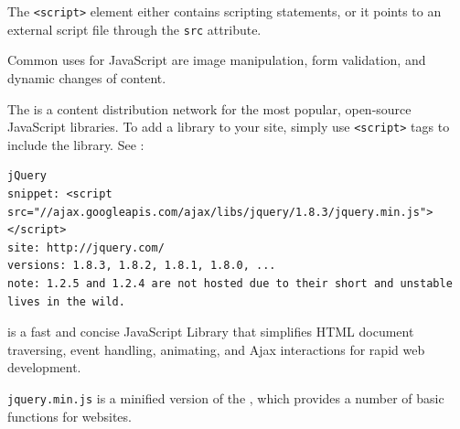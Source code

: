 The \verb|<script>| element either contains scripting statements, or it points to an external script file through the \verb|src| attribute.

Common uses for JavaScript are image manipulation, form validation, and dynamic changes of content.

The  is a content distribution network for
the most popular, open-source JavaScript libraries. To add a library
to your site, simply use \verb|<script>| tags to include the library.
See :
\begin{verbatim}
jQuery
snippet: <script src="//ajax.googleapis.com/ajax/libs/jquery/1.8.3/jquery.min.js"></script>
site: http://jquery.com/
versions: 1.8.3, 1.8.2, 1.8.1, 1.8.0, ...
note: 1.2.5 and 1.2.4 are not hosted due to their short and unstable lives in the wild.
\end{verbatim}

 is a fast and concise JavaScript Library that simplifies
HTML document traversing, event handling, animating, and Ajax
interactions for rapid web development.

\verb|jquery.min.js| is a minified version of the ,
which provides a number of basic functions for websites. 


